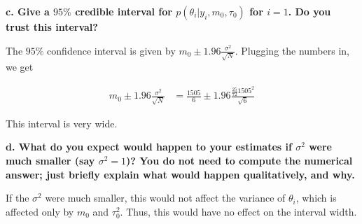 {\textbf{c. Give a $95\%$ credible interval for $p(\theta_i|y_i,m_0,\tau_0)$
for $i=1$. Do you trust this interval?}

The $95\%$ confidence interval is given by $m_0\pm 1.96\frac{\sigma^2}{\sqrt{N}}$.
Plugging the numbers in, we get

\begin{align}
    m_0 \pm 1.96\frac{\sigma^2}{\sqrt{N}} & =
    \frac{1505}{6} \pm 1.96\frac{\frac{25}{72}1505^2}{\sqrt{6}}
\end{align}

This interval is very wide.

\textbf{d. What do you expect would happen to your estimates if $\sigma^2$
were much smaller (say $\sigma^2 = 1$)? You do not need to compute the
numerical answer; just briefly explain what would happen qualitatively, and why.}

If the $\sigma^2$ were much smaller, this would not affect the variance of
$\theta_i$, which is affected only by $m_0$ and $\tau_0^2$. Thus, this would
have no effect on the interval width.

}

